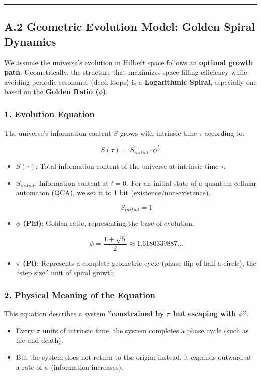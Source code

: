 \hrule

\subsection{A.2 Geometric Evolution Model: Golden Spiral Dynamics}

We assume the universe's evolution in Hilbert space follows an \textbf{optimal growth path}. Geometrically, the structure that maximizes space-filling efficiency while avoiding periodic resonance (dead loops) is a \textbf{Logarithmic Spiral}, especially one based on the \textbf{Golden Ratio ($\phi$)}.

\subsubsection{1. Evolution Equation}

The universe's information content $S$ grows with intrinsic time $\tau$ according to:

$$S(\tau) = S_{initial} \cdot \phi^{\frac{\tau}{\pi}}$$

\begin{itemize}
\item \textbf{$S(\tau)$}: Total information content of the universe at intrinsic time $\tau$.

\item \textbf{$S_{initial}$}: Information content at $t=0$. For an initial state of a quantum cellular automaton (QCA), we set it to 1 bit (existence/non-existence).

    $$S_{initial} = 1$$

\item \textbf{$\phi$ (Phi)}: Golden ratio, representing the base of evolution.

    $$\phi = \frac{1+\sqrt{5}}{2} \approx 1.6180339887...$$

\item \textbf{$\pi$ (Pi)}: Represents a complete geometric cycle (phase flip of half a circle), the ``step size'' unit of spiral growth.
\end{itemize}

\subsubsection{2. Physical Meaning of the Equation}

This equation describes a system \textbf{''constrained by $\pi$ but escaping with $\phi$''}.

\begin{itemize}
\item Every $\pi$ units of intrinsic time, the system completes a phase cycle (such as life and death).

\item But the system does not return to the origin; instead, it expands outward at a rate of $\phi$ (information increases).
\end{itemize}

